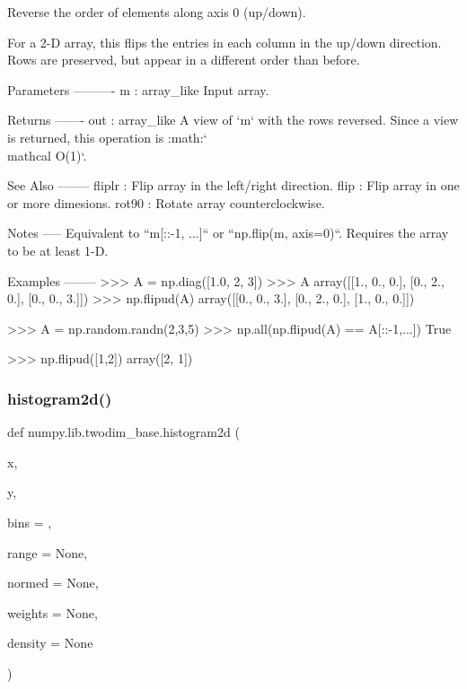 \begin{DoxyVerb}Reverse the order of elements along axis 0 (up/down).

For a 2-D array, this flips the entries in each column in the up/down
direction. Rows are preserved, but appear in a different order than before.

Parameters
----------
m : array_like
    Input array.

Returns
-------
out : array_like
    A view of `m` with the rows reversed.  Since a view is
    returned, this operation is :math:`\\mathcal O(1)`.

See Also
--------
fliplr : Flip array in the left/right direction.
flip : Flip array in one or more dimesions.
rot90 : Rotate array counterclockwise.

Notes
-----
Equivalent to ``m[::-1, ...]`` or ``np.flip(m, axis=0)``.
Requires the array to be at least 1-D.

Examples
--------
>>> A = np.diag([1.0, 2, 3])
>>> A
array([[1.,  0.,  0.],
       [0.,  2.,  0.],
       [0.,  0.,  3.]])
>>> np.flipud(A)
array([[0.,  0.,  3.],
       [0.,  2.,  0.],
       [1.,  0.,  0.]])

>>> A = np.random.randn(2,3,5)
>>> np.all(np.flipud(A) == A[::-1,...])
True

>>> np.flipud([1,2])
array([2, 1])\end{DoxyVerb}
 \mbox{\label{namespacenumpy_1_1lib_1_1twodim__base_a890a4b6f905191422798139ce511849a}} 
\subsubsection{\texorpdfstring{histogram2d()}{histogram2d()}}
{\footnotesize\ttfamily def numpy.\+lib.\+twodim\+\_\+base.\+histogram2d (\begin{DoxyParamCaption}\item[{}]{x,  }\item[{}]{y,  }\item[{}]{bins = {},  }\item[{}]{range = {\ttfamily None},  }\item[{}]{normed = {\ttfamily None},  }\item[{}]{weights = {\ttfamily None},  }\item[{}]{density = {\ttfamily None} }\end{DoxyParamCaption})}

